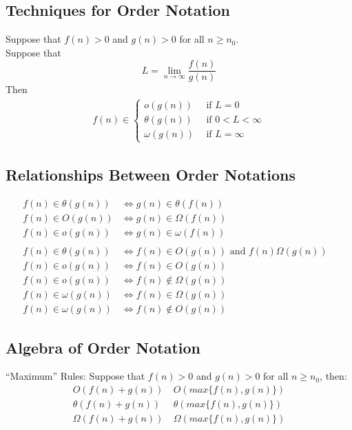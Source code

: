 \documentclass[12pt]{article}
\theoremstyle{definition}
\begin{document}
\subsection{Techniques for Order Notation}
Suppose that $f(n) > 0$ and $g(n) > 0$ for all $n \geq n_{0}$. \\
Suppose that
$$L = \lim_{n\to\infty}\frac{f(n)}{g(n)}$$
Then
\begin{align*}
f(n) \in
\begin{cases}
o(g(n)) ~~&\text{if } L = 0 \\
\theta(g(n)) ~~& \text{if } 0 < L < \infty \\
\omega(g(n)) ~~&\text{if } L = \infty
\end{cases}
\end{align*}

\subsection{Relationships Between Order Notations}
\begin{align*}
f(n) \in \theta(g(n)) &\Longleftrightarrow g(n) \in \theta(f(n))& \\
f(n) \in O(g(n)) &\Longleftrightarrow g(n) \in \Omega(f(n))& \\
f(n) \in o(g(n)) &\Longleftrightarrow g(n) \in \omega(f(n))& \\ \\
f(n) \in \theta(g(n)) &\Longleftrightarrow
  f(n) \in O(g(n)) \text{ and } f(n) \Omega(g(n))& \\
f(n) \in o(g(n)) &\Longleftrightarrow f(n) \in O(g(n)) \\
f(n) \in o(g(n)) &\Longleftrightarrow f(n) \not\in \Omega(g(n)) \\
f(n) \in \omega(g(n)) &\Longleftrightarrow f(n) \in \Omega(g(n)) \\
f(n) \in \omega(g(n)) &\Longleftrightarrow f(n) \not\in O(g(n))
\end{align*}

\subsection{Algebra of Order Notation}
``Maximum'' Rules: Suppose that $f(n) > 0$ and $g(n) > 0$ for all $n \geq n_{0}$, then:
\begin{align*}
O(f(n) + g(n)) &\ O(max\{f(n), g(n)\}) \\
\theta(f(n) + g(n)) &\ \theta(max\{f(n), g(n)\}) \\
\Omega(f(n) + g(n)) &\ \Omega(max\{f(n), g(n)\})
\end{align*}
\end{document}
